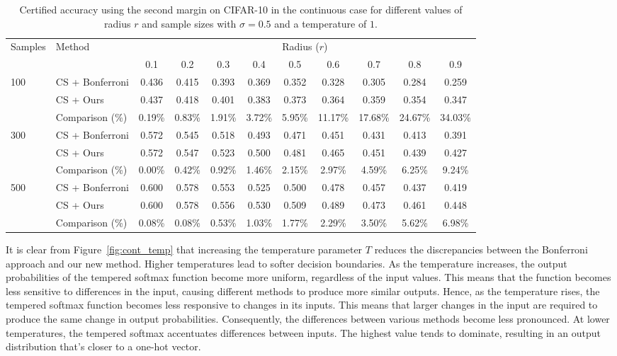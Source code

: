 \begin{table}[htbp]
    \centering
    \caption{Certified accuracy using the second margin on CIFAR-10 in the continuous case for different values of radius $r$ and sample sizes with $\sigma = 0.5$ and a temperature of $1$.}
    \label{tab:certified-accuracy-2}
    \renewcommand{\arraystretch}{1.2}
    \begin{tabular}{@{}ll*{9}{c}@{}}
        \toprule
        \multirow{2}{*}{Samples} & \multirow{2}{*}{Method} & \multicolumn{9}{c}{Radius ($r$)} \\
        \cmidrule(l){3-11}
        & & 0.1 & 0.2 & 0.3 & 0.4 & 0.5 & 0.6 & 0.7 & 0.8 & 0.9 \\
        \midrule
        \multirow{3}{*}{100}
        & CS + Bonferroni & 0.436 & 0.415 & 0.393 & 0.369 & 0.352 & 0.328 & 0.305 & 0.284 & 0.259 \\
        & CS + Ours             & 0.437 & 0.418 & 0.401 & 0.383 & 0.373 & 0.364 & 0.359 & 0.354 & 0.347 \\
        & Comparison (\%) & 0.19\% & 0.83\% & 1.91\% & 3.72\% & 5.95\% & 11.17\% & 17.68\% & 24.67\% & 34.03\% \\
        \midrule
        \multirow{3}{*}{300}
        & CS + Bonferroni & 0.572 & 0.545 & 0.518 & 0.493 & 0.471 & 0.451 & 0.431 & 0.413 & 0.391 \\
        & CS + Ours             & 0.572 & 0.547 & 0.523 & 0.500 & 0.481 & 0.465 & 0.451 & 0.439 & 0.427 \\
        & Comparison (\%) & 0.00\% & 0.42\% & 0.92\% & 1.46\% & 2.15\% & 2.97\% & 4.59\% & 6.25\% & 9.24\% \\
        \midrule
        \multirow{3}{*}{500}
        & CS + Bonferroni & 0.600 & 0.578 & 0.553 & 0.525 & 0.500 & 0.478 & 0.457 & 0.437 & 0.419 \\
        & CS + Ours             & 0.600 & 0.578 & 0.556 & 0.530 & 0.509 & 0.489 & 0.473 & 0.461 & 0.448 \\
        & Comparison (\%) & 0.08\% & 0.08\% & 0.53\% & 1.03\% & 1.77\% & 2.29\% & 3.50\% & 5.62\% & 6.98\% \\
        \bottomrule
    \end{tabular}
\end{table}

It is clear from Figure~\ref{fig:cont_temp} that increasing the temperature parameter $T$ reduces the discrepancies between the Bonferroni approach and our new method.
Higher temperatures lead to softer decision boundaries.
As the temperature increases, the output probabilities of the tempered softmax function become more uniform, regardless of the input values.
This means that the function becomes less sensitive to differences in the input, causing different methods to produce more similar outputs.
Hence, as the temperature rises, the tempered softmax function becomes less responsive to changes in its inputs.
This means that larger changes in the input are required to produce the same change in output probabilities.
Consequently, the differences between various methods become less pronounced.
At lower temperatures, the tempered softmax accentuates differences between inputs.
The highest value tends to dominate, resulting in an output distribution that's closer to a one-hot vector.
